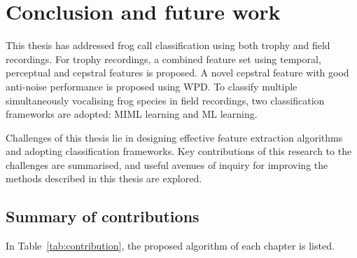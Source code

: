 
\chapter[Conclusion]{Conclusion and future work}
\label{cha:cha8Conclusions}

This thesis has addressed frog call classification using both trophy and field recordings. For trophy recordings, a combined feature set using temporal, perceptual and cepstral features is proposed. A novel cepstral feature with good anti-noise performance is proposed using WPD. 
To classify multiple simultaneously vocalising frog species in field recordings, two classification frameworks are adopted: MIML learning and ML learning. 

Challenges of this thesis lie in designing effective feature extraction algorithms and adopting classification frameworks. Key contributions of this research to the challenges are summarised, and useful avenues of inquiry for improving the methods described in this thesis are explored.

\section{Summary of contributions}
	
In Table~\ref{tab:contribution}, the proposed algorithm of each chapter is listed.

